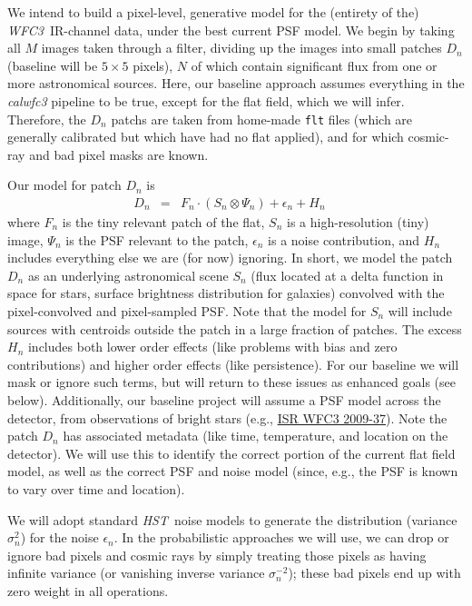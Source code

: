\documentclass[12pt]{article}
\newcommand{\project}[1]{\textsl{#1}}
\newcommand{\HST}{\project{HST}}
\newcommand{\WFC}{\project{WFC3}}
\begin{document}
We intend to build a pixel-level, generative model
for the (entirety of the) \WFC\ IR-channel data, under the best current PSF model.  We begin by
taking all $M$ images taken through a filter, dividing up the images into
small patches $D_n$ (baseline will be $5 \times 5$ pixels), $N$ of which contain
significant flux from one or more astronomical sources.  Here, our baseline approach assumes
everything in the \textsl{calwfc3} pipeline to be true, except for the
flat field, which we will infer.  Therefore, the $D_n$ patchs are taken
from home-made \texttt{flt} files (which are generally calibrated but which have had no flat applied), and for
which cosmic-ray and bad pixel masks are known.

Our model for patch $D_n$ is
\begin{eqnarray}
D_n & = & F_n \cdot (S_n \otimes \Psi_n) + \epsilon_n + H_n
\quad 
\end{eqnarray}
where $F_n$ is the tiny relevant patch of the flat, $S_n$ is a high-resolution (tiny) image, $\Psi_n$
is the PSF relevant to the patch, $\epsilon_n$ is a noise
contribution, and $H_n$ includes everything else we are (for now) ignoring.
In short, we model the patch $D_n$ as an underlying astronomical scene
$S_n$ (flux located at a delta function in space for stars, surface
brightness distribution for galaxies) convolved with the
pixel-convolved and pixel-sampled PSF.  Note that the model for $S_n$
will include sources with centroids outside the patch in a large
fraction of patches.  The excess $H_n$ includes both lower order
effects (like problems with bias and zero contributions) and higher order effects
(like persistence).  For our baseline we will mask or ignore such
terms, but will return to these issues as enhanced goals (see below).
Additionally, our baseline project will assume a PSF model across the
detector, from observations of bright stars (e.g.,
\href{http://bit.ly/XFSb1M}{ISR WFC3 2009-37}).  Note the patch $D_n$
has associated metadata (like time, temperature, and location on the
detector).  We will use this to identify the correct portion of the
current flat field model, as well as the correct PSF and noise model
(since, e.g., the PSF is known to vary over time and location).

We will adopt standard \HST\ noise models to generate the distribution
(variance $\sigma_n^2$) for the noise $\epsilon_n$.  In the
probabilistic approaches we will use, we can drop or ignore bad pixels
and cosmic rays by simply treating those pixels as having infinite
variance (or vanishing inverse variance $\sigma_n^{-2}$); these bad
pixels end up with zero weight in all operations.
\end{document}
